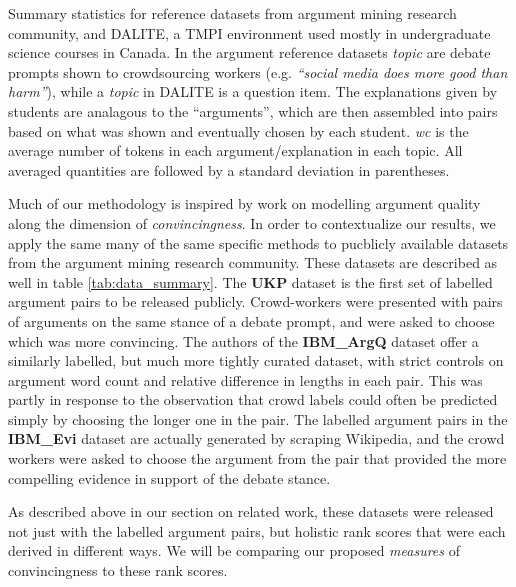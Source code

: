 \documentclass[notitlepage,12pt]{jedm}
\begin{document}
\begin{table}
	
	\caption{
		Summary statistics for reference datasets from argument mining research 
		community, and DALITE, a TMPI environment used mostly in undergraduate 
		science courses in Canada. 
		In the argument reference datasets \textit{topic} are debate prompts 
		shown to crowdsourcing workers (e.g. \textit{``social media does more 
		good than harm''}), while a \textit{topic} in DALITE is a question item.
		The explanations given by students are analagous to the ``arguments'',  
		which are then assembled into pairs based on what was shown and 
		eventually chosen by each student.
		\textit{wc} is the average number of tokens in each 
		argument/explanation in each topic.
		All averaged quantities are followed by a standard deviation in 
		parentheses.
	}
	\label{tab:data_summary}
\end{table}

Much of our methodology is inspired by work on modelling argument quality along 
the dimension of \textit{convincingness}. 
In order to contextualize our results, we apply the same many of the same 
specific methods to pucblicly available datasets from the argument mining 
research community. 
These datasets are described as well in table \ref{tab:data_summary}. 
The \textbf{UKP} dataset\cite{habernal_which_2016} is the first set of labelled 
argument pairs to be released publicly.
Crowd-workers were presented with pairs of arguments on the same stance of a 
debate prompt, and were asked to choose which was more convincing.
The authors of the \textbf{IBM\_ArgQ} dataset\cite{toledo_automatic_2019} offer 
a similarly labelled, but much more tightly curated dataset, with strict 
controls on argument word count and relative difference in lengths in each pair.
This was partly in response to the observation that crowd labels could often be 
predicted simply by choosing the longer one in the pair.
The labelled argument pairs in the \textbf{IBM\_Evi} dataset 
\cite{gleize_are_2019} are actually generated by scraping Wikipedia, and the 
crowd workers were asked to choose the argument from the pair that provided the 
more compelling evidence in support of the debate stance.

As described above in our section on related work, these datasets were released 
not just with the labelled argument pairs, but holistic rank scores that were 
each derived in different ways. 
We will be comparing our proposed \textit{measures} of convincingness to these 
rank scores.
\end{document}
